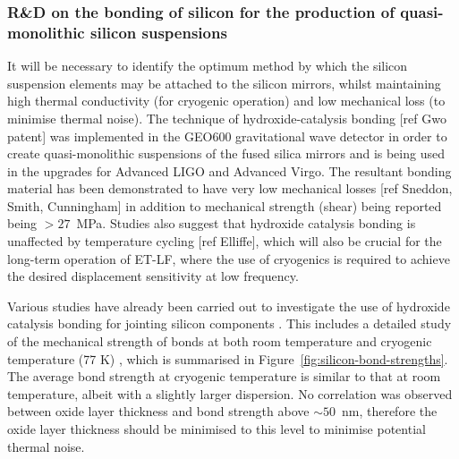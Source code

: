 \FloatBarrier
\subsubsection{R\&D on the bonding of silicon for the production of quasi-monolithic silicon suspensions}
\label{sec:bonding}


It will be necessary to identify the optimum method by which the silicon suspension elements may be attached to the silicon mirrors, whilst maintaining high thermal conductivity (for cryogenic operation) and low mechanical loss (to minimise thermal noise).  The technique of hydroxide-catalysis bonding [ref Gwo patent] was implemented in the GEO600 gravitational wave detector in order to create quasi-monolithic suspensions of the fused silica mirrors and is being used in the upgrades for Advanced LIGO and Advanced Virgo.  The resultant bonding material has been demonstrated to have very low mechanical losses [ref Sneddon, Smith, Cunningham] in addition to mechanical strength (shear) being reported being $>27$~MPa.  Studies also suggest that hydroxide catalysis bonding is unaffected by temperature cycling [ref Elliffe], which will also be crucial for the long-term operation of ET-LF, where the use of cryogenics is required to achieve the desired displacement sensitivity at low frequency.

Various studies have already been carried out to investigate the use of hydroxide catalysis bonding for jointing silicon components \cite{Veggel2009, Beveridge2011}.  This includes a detailed study of the mechanical strength of bonds at both room temperature and cryogenic temperature (77 K) \cite{Beveridge2011}, which is summarised in Figure~\ref{fig:silicon-bond-strengths}. The average bond strength at cryogenic temperature is similar to that at room temperature, albeit with a slightly larger dispersion. No correlation was observed between oxide layer thickness and bond strength above $\sim 50$~nm, therefore the oxide layer thickness should be minimised to this level to minimise potential thermal noise.

